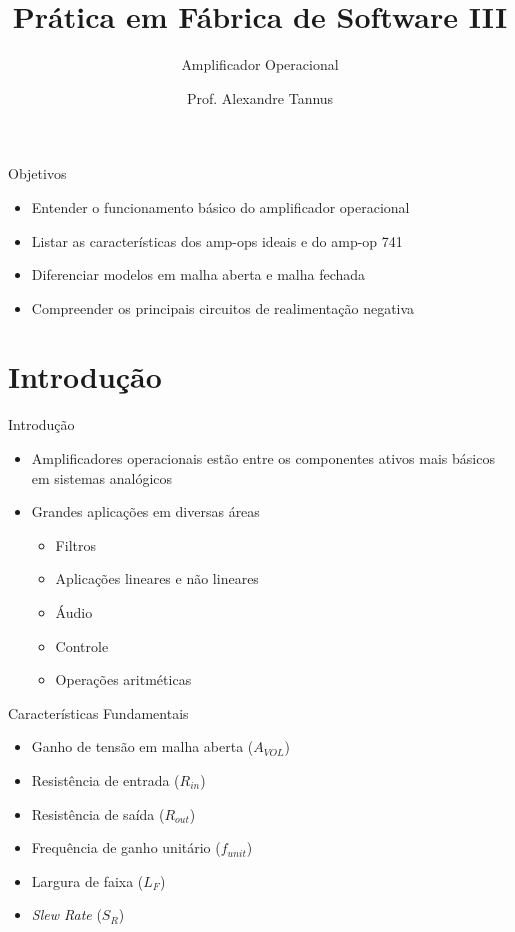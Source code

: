 \documentclass[aspectratio=169,
				xcolor=table]{beamer}
\institute[]{\uppercase{Engenharia da Computação}}
\title[]{Prática em Fábrica de Software III}
\subtitle[]{Amplificador Operacional}
\author[]{Prof. Alexandre Tannus}
\date{}
\begin{document}
	\begin{frame}
		\titlepage
	\end{frame}
	
	\begin{frame}{Objetivos}
		\begin{itemize}
			\item Entender o funcionamento básico do amplificador operacional
			\vspace{1em}
			\item Listar as características dos amp-ops ideais e do amp-op 741
			\vspace{1em}
			\item Diferenciar modelos em malha aberta e malha fechada
			\vspace{1em}
			\item Compreender os principais circuitos de realimentação negativa
		\end{itemize}
	\end{frame}

	\section{Introdução}
	\begin{frame}{Introdução}
		\begin{itemize}
			\item Amplificadores operacionais estão entre os componentes ativos mais básicos em sistemas analógicos
			\vspace{1em}
			\item Grandes aplicações em diversas áreas
			\begin{itemize}
				\item Filtros
				\item Aplicações lineares e não lineares
				\item Áudio
				\item Controle
				\item Operações aritméticas
			\end{itemize}			
		\end{itemize}
	\end{frame}
	
	\begin{frame}{Características Fundamentais}
		\begin{itemize}
			\item Ganho de tensão em malha aberta ($A_{VOL}$)
			\item Resistência de entrada ($R_{in}$)
			\item Resistência de saída ($R_{out}$)
			\item Frequência de ganho unitário ($f_{unit}$)
			\item Largura de faixa ($L_F$)
			\item \textit{Slew Rate} ($S_R$)
		\end{itemize}
	\end{frame}
	
\end{document}

